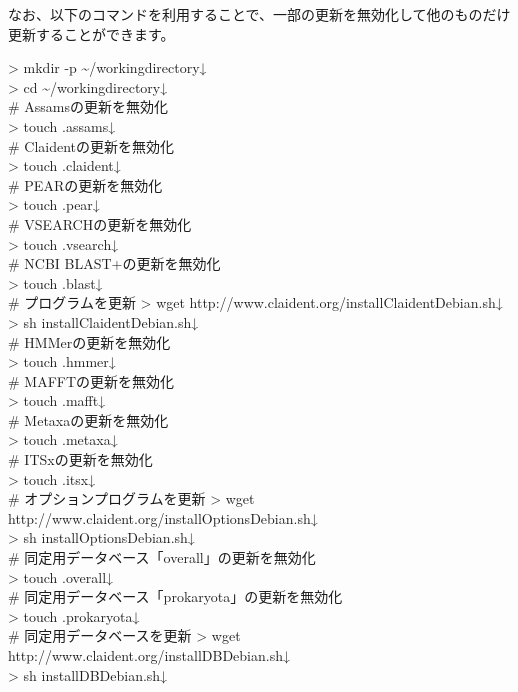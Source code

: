 \documentclass[titlepage,10pt,a4paper]{jsbook}
\newenvironment{cmd}{\begin{oframed}\raggedright\ttfamily\footnotesize\setlength{\baselineskip}{1.4em}}{\end{oframed}\vspace{-1em}}
\begin{document}
なお、以下のコマンドを利用することで、一部の更新を無効化して他のものだけ更新することができます。
\begin{cmd}
{\textgreater} mkdir -p {\textasciitilde}/workingdirectory↓\\
{\textgreater} cd {\textasciitilde}/workingdirectory↓\\
\# Assamsの更新を無効化\\
{\textgreater} touch .assams↓\\
\# Claidentの更新を無効化\\
{\textgreater} touch .claident↓\\
\# PEARの更新を無効化\\
{\textgreater} touch .pear↓\\
\# VSEARCHの更新を無効化\\
{\textgreater} touch .vsearch↓\\
\# NCBI BLAST+の更新を無効化\\
{\textgreater} touch .blast↓\\
\# プログラムを更新
{\textgreater} wget http://www.claident.org/installClaident{\textunderscore}Debian.sh↓\\
{\textgreater} sh installClaident{\textunderscore}Debian.sh↓\\
\# HMMerの更新を無効化\\
{\textgreater} touch .hmmer↓\\
\# MAFFTの更新を無効化\\
{\textgreater} touch .mafft↓\\
\# Metaxaの更新を無効化\\
{\textgreater} touch .metaxa↓\\
\# ITSxの更新を無効化\\
{\textgreater} touch .itsx↓\\
\# オプションプログラムを更新
{\textgreater} wget http://www.claident.org/installOptions{\textunderscore}Debian.sh↓\\
{\textgreater} sh installOptions{\textunderscore}Debian.sh↓\\
\# 同定用データベース「overall」の更新を無効化\\
{\textgreater} touch .overall↓\\
\# 同定用データベース「prokaryota」の更新を無効化\\
{\textgreater} touch .prokaryota↓\\
\# 同定用データベースを更新
{\textgreater} wget http://www.claident.org/installDB{\textunderscore}Debian.sh↓\\
{\textgreater} sh installDB{\textunderscore}Debian.sh↓\\

\end{cmd}
\end{document}
